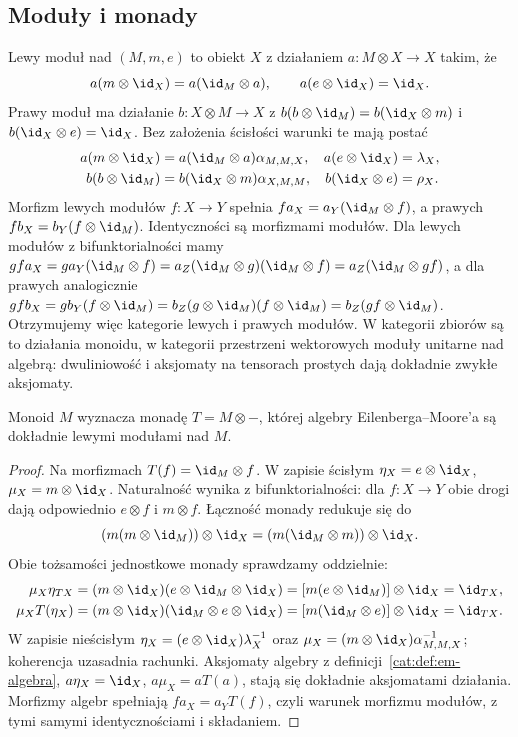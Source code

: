 \subsection{Moduły i monady}
\begin{definicja}\label{cat:def:monoid-module}
Lewy moduł nad $(M,m,e)$ to obiekt $X$ z działaniem $a:M\otimes X\to X$ takim, że
\[
a(m\otimes\id_X)=a(\id_M\otimes a),\qquad a(e\otimes\id_X)=\id_X.
\]
Prawy moduł ma działanie $b:X\otimes M\to X$ z $b(b\otimes\id_M)=b(\id_X\otimes m)$ i $b(\id_X\otimes e)=\id_X$. Bez założenia ścisłości warunki te mają postać
\[
\begin{aligned}
a(m\otimes\id_X)&=a(\id_M\otimes a)\alpha_{M,M,X},&
a(e\otimes\id_X)&=\lambda_X,\\
b(b\otimes\id_M)&=b(\id_X\otimes m)\alpha_{X,M,M},&
b(\id_X\otimes e)&=\rho_X.
\end{aligned}
\]
Morfizm lewych modułów $f:X\to Y$ spełnia $fa_X=a_Y(\id_M\otimes f)$, a prawych $fb_X=b_Y(f\otimes\id_M)$. Identyczności są morfizmami modułów. Dla lewych modułów z bifunktorialności mamy
$gfa_X=ga_Y(\id_M\otimes f)=a_Z(\id_M\otimes g)(\id_M\otimes f)=a_Z(\id_M\otimes gf)$,
a dla prawych analogicznie
$gfb_X=gb_Y(f\otimes\id_M)=b_Z(g\otimes\id_M)(f\otimes\id_M)=b_Z(gf\otimes\id_M)$.
Otrzymujemy więc kategorie lewych i prawych modułów. W kategorii zbiorów są to działania monoidu, w kategorii przestrzeni wektorowych moduły unitarne nad algebrą: dwuliniowość i aksjomaty na tensorach prostych dają dokładnie zwykłe aksjomaty.
\end{definicja}
\begin{stwierdzenie}\label{cat:prop:monoid-module-monad}
Monoid $M$ wyznacza monadę $T=M\otimes-$, której algebry Eilenberga--Moore'a są dokładnie lewymi modułami nad $M$.
\end{stwierdzenie}
\begin{proof}
Na morfizmach $T(f)=\id_M\otimes f$. W zapisie ścisłym $\eta_X=e\otimes\id_X$, $\mu_X=m\otimes\id_X$. Naturalność wynika z bifunktorialności: dla $f:X\to Y$ obie drogi dają odpowiednio $e\otimes f$ i $m\otimes f$. Łączność monady redukuje się do
\[
(m(m\otimes\id_M))\otimes\id_X=(m(\id_M\otimes m))\otimes\id_X.
\]
Obie tożsamości jednostkowe monady sprawdzamy oddzielnie:
\[
\begin{aligned}
\mu_X\eta_{TX}&=(m\otimes\id_X)(e\otimes\id_M\otimes\id_X)
=[m(e\otimes\id_M)]\otimes\id_X=\id_{TX},\\
\mu_XT(\eta_X)&=(m\otimes\id_X)(\id_M\otimes e\otimes\id_X)
=[m(\id_M\otimes e)]\otimes\id_X=\id_{TX}.
\end{aligned}
\] W zapisie nieścisłym $\eta_X=(e\otimes\id_X)\lambda_X^{-1}$ oraz $\mu_X=(m\otimes\id_X)\alpha_{M,M,X}^{-1}$; koherencja uzasadnia rachunki. Aksjomaty algebry z definicji~\ref{cat:def:em-algebra}, $a\eta_X=\id_X$, $a\mu_X=aT(a)$, stają się dokładnie aksjomatami działania. Morfizmy algebr spełniają $fa_X=a_YT(f)$, czyli warunek morfizmu modułów, z tymi samymi identycznościami i składaniem.
\end{proof}
